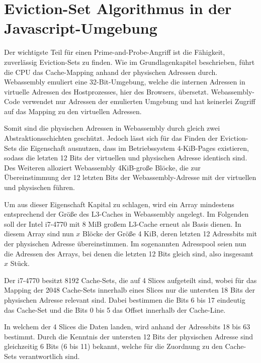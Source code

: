 \section{Eviction-Set Algorithmus in der Javascript-Umgebung}
Der wichtigste Teil für einen Prime-and-Probe-Angriff ist die Fähigkeit, zuverlässig Eviction-Sets zu finden. Wie im Grundlagenkapitel beschrieben, führt die CPU das Cache-Mapping anhand der physischen Adressen durch. Webassembly emuliert eine 32-Bit-Umgebung, welche die internen Adressen in virtuelle Adressen des Hostprozesses, hier des Browsers, übersetzt. 
Webassembly-Code verwendet nur Adressen der emulierten Umgebung und hat keinerlei Zugriff auf das Mapping zu den virtuellen Adressen. 

Somit sind die physischen Adressen in Webassembly durch gleich zwei Abstraktionsschichten geschützt. 
Jedoch lässt sich für das Finden der Eviction-Sets die Eigenschaft ausnutzen, dass im Betriebssystem 4-KiB-Pages existieren, sodass die letzten 12 Bits der virtuellen und physischen Adresse identisch sind. 
Des Weiteren alloziert %
Webassembly 4KiB-große Blöcke, die zur Übereinstimmung der 12 letzten Bits der Webassembly-Adresse mit der virtuellen und physischen führen.

Um aus dieser Eigenschaft Kapital zu schlagen, wird ein Array mindestens entsprechend der Größe des L3-Caches in Webassembly angelegt. Im Folgenden soll der Intel i7-4770 mit 8 MiB großem L3-Cache erneut als Basis dienen. In diesem Array sind nun $x$ Blöcke der Größe 4 KiB, deren letzten 12 Adressbits mit der physischen Adresse übereinstimmen. Im sogenannten Adresspool seien nun die Adressen des Arrays, bei denen die letzten 12 Bits gleich sind, also insgesamt $x$ Stück.

Der i7-4770 besitzt 8192 Cache-Sets, die auf 4 Slices aufgeteilt sind, wobei für das Mapping der 2048 Cache-Sets innerhalb eines Slices nur die untersten 18 Bits der physischen Adresse relevant sind. Dabei bestimmen die Bits 6 bis 17 eindeutig das Cache-Set und die Bits 0 bis 5 das Offset innerhalb der Cache-Line.

In welchem der 4 Slices die Daten landen, wird anhand der Adressbits 18 bis 63 bestimmt.
Durch die Kenntnis der untersten 12 Bits der physischen Adresse sind gleichzeitig 6 Bits (6 bis 11) bekannt, welche für die Zuordnung zu den Cache-Sets verantwortlich sind.

